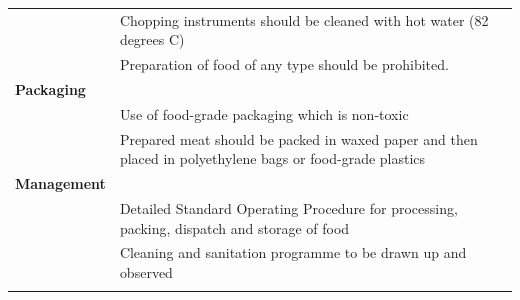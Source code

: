 \documentclass[a4paper, 12pt, twoside]{article}
\newcommand\tabitem{\makebox[1em][r]{\textbullet~}}
\begin{document}
\begin{longtable}[l]{>{\raggedright}p{6.5cm}>{\raggedright\arraybackslash}p{8.5cm}}
	&	\newline{}\tabitem Chopping instruments should be cleaned with hot water (82 degrees C)\\
	&	\newline{}\tabitem Preparation of food of any type should be prohibited. \\
    \midrule
  \textbf{Packaging}	&	 \\
    \midrule
          & \tabitem Use of food-grade packaging which is non-toxic\\
	&	\newline{} \tabitem Prepared meat should be packed in waxed paper and then placed in polyethylene bags or food-grade plastics \\
    \midrule
  \textbf{Management} 	&	 \\
    \midrule
          &	\tabitem Detailed Standard Operating Procedure for processing, packing, dispatch and storage of food\\
	&	\newline{} \tabitem Cleaning and sanitation programme to be drawn up and observed \\
\bottomrule

  \label{tab:addlabel}%
\end{longtable}%
\end{document}
